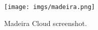 \begin{figure}[tb]
  \texttt{[image: imgs/madeira.png]}
  \caption{Madeira Cloud screenshot.}
  \label{fig:madeira}
\end{figure}
